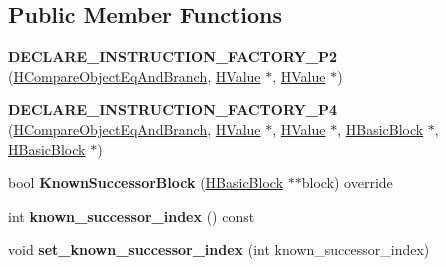 \subsection*{Public Member Functions}
\begin{DoxyCompactItemize}
\item 
{\bfseries D\+E\+C\+L\+A\+R\+E\+\_\+\+I\+N\+S\+T\+R\+U\+C\+T\+I\+O\+N\+\_\+\+F\+A\+C\+T\+O\+R\+Y\+\_\+\+P2} (\hyperlink{classv8_1_1internal_1_1_h_compare_object_eq_and_branch}{H\+Compare\+Object\+Eq\+And\+Branch}, \hyperlink{classv8_1_1internal_1_1_h_value}{H\+Value} $\ast$, \hyperlink{classv8_1_1internal_1_1_h_value}{H\+Value} $\ast$)\hypertarget{classv8_1_1internal_1_1_h_compare_object_eq_and_branch_aafed8dc44aec043a56bfbaae2db77e28}{}\label{classv8_1_1internal_1_1_h_compare_object_eq_and_branch_aafed8dc44aec043a56bfbaae2db77e28}

\item 
{\bfseries D\+E\+C\+L\+A\+R\+E\+\_\+\+I\+N\+S\+T\+R\+U\+C\+T\+I\+O\+N\+\_\+\+F\+A\+C\+T\+O\+R\+Y\+\_\+\+P4} (\hyperlink{classv8_1_1internal_1_1_h_compare_object_eq_and_branch}{H\+Compare\+Object\+Eq\+And\+Branch}, \hyperlink{classv8_1_1internal_1_1_h_value}{H\+Value} $\ast$, \hyperlink{classv8_1_1internal_1_1_h_value}{H\+Value} $\ast$, \hyperlink{classv8_1_1internal_1_1_h_basic_block}{H\+Basic\+Block} $\ast$, \hyperlink{classv8_1_1internal_1_1_h_basic_block}{H\+Basic\+Block} $\ast$)\hypertarget{classv8_1_1internal_1_1_h_compare_object_eq_and_branch_aaaab7f37bc8fe74d5ef61aba11b9099a}{}\label{classv8_1_1internal_1_1_h_compare_object_eq_and_branch_aaaab7f37bc8fe74d5ef61aba11b9099a}

\item 
bool {\bfseries Known\+Successor\+Block} (\hyperlink{classv8_1_1internal_1_1_h_basic_block}{H\+Basic\+Block} $\ast$$\ast$block) override\hypertarget{classv8_1_1internal_1_1_h_compare_object_eq_and_branch_afd5ef7d45d966c896ac2f3a29b612821}{}\label{classv8_1_1internal_1_1_h_compare_object_eq_and_branch_afd5ef7d45d966c896ac2f3a29b612821}

\item 
int {\bfseries known\+\_\+successor\+\_\+index} () const \hypertarget{classv8_1_1internal_1_1_h_compare_object_eq_and_branch_a116a09d3c3b51e058a7be77ee5067581}{}\label{classv8_1_1internal_1_1_h_compare_object_eq_and_branch_a116a09d3c3b51e058a7be77ee5067581}

\item 
void {\bfseries set\+\_\+known\+\_\+successor\+\_\+index} (int known\+\_\+successor\+\_\+index)\hypertarget{classv8_1_1internal_1_1_h_compare_object_eq_and_branch_a106d8525f647a497c940a25225712d1b}{}\label{classv8_1_1internal_1_1_h_compare_object_eq_and_branch_a106d8525f647a497c940a25225712d1b}


\end{DoxyCompactItemize}
